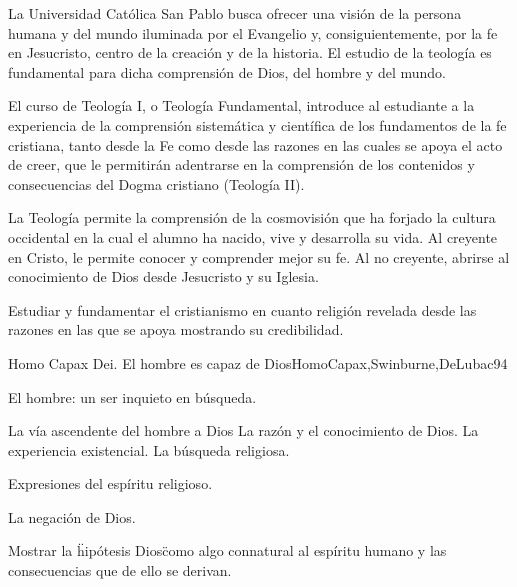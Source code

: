 \begin{syllabus}


\begin{justification}
La Universidad Católica San Pablo busca ofrecer una visión de la persona humana y del mundo iluminada por el Evangelio y, consiguientemente, por la fe en Jesucristo, centro de la creación y de la historia. El estudio de la teología es fundamental para dicha comprensión de Dios, del hombre y del mundo.

El curso de Teología I, o Teología Fundamental, introduce al estudiante a la experiencia de la comprensión sistemática y científica de los fundamentos de la fe cristiana, tanto desde la Fe como desde las razones en las cuales se apoya el acto de creer, que le permitirán adentrarse en la comprensión de los contenidos y consecuencias del Dogma cristiano (Teología II).

La Teología permite la comprensión de la cosmovisión que ha forjado la cultura occidental en la cual el alumno ha nacido, vive y desarrolla su vida. Al creyente en Cristo, le permite conocer y comprender mejor su fe. Al no creyente, abrirse al conocimiento de Dios desde Jesucristo y su Iglesia.
\end{justification}

\begin{goals}
\item Estudiar y fundamentar el cristianismo en cuanto religión revelada desde las razones en las que se apoya mostrando su credibilidad. 
\end{goals}

\begin{outcomes}
\end{outcomes}

\begin{unit}{Homo Capax Dei. El hombre es capaz de Dios}{HomoCapax,Swinburne,DeLubac}{9}{4}
\begin{topics}
	\item El hombre: un ser inquieto en búsqueda.
	\item	La vía ascendente del hombre a Dios
		\subitem	La razón y el conocimiento de Dios.
		\subitem	La experiencia existencial.
		\subitem	La búsqueda religiosa.
	\item	Expresiones del espíritu religioso.
	\item	La negación de Dios.
\end{topics}
\begin{learningoutcomes}
	\item Mostrar la \"hipótesis Dios\" como algo connatural al espíritu humano y las consecuencias que de ello se derivan.
\end{learningoutcomes}
\end{unit}


\end{syllabus}

